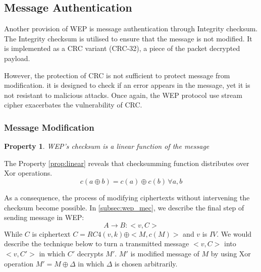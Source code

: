 \subsection{Message Authentication}
Another provision of \ac{WEP} is message authentication through Integrity checksum. The Integrity checksum is utilised to ensure that the message is not modified. It is implemented as a \ac{CRC} variant (\ac{CRC}-32), a piece of the packet decrypted payload.

However, the protection of \ac{CRC} is not sufficient to protect message from modification. it is designed to check if an error appears in the message, yet it is not resistant to malicious attacks. Once again, the \ac{WEP} protocol use stream cipher exacerbates the vulnerability of \ac{CRC}.

\subsubsection{Message Modification}
\newtheorem{property}{Property}

\begin{property}
	\ac{WEP}'s checksum is a linear function of the message
	\label{prop:linear}
\end{property}

The Property \autoref{prop:linear} reveals that checksumming function distributes over \ac{Xor} operations.
\begin{equation}
	c(a\oplus b) = c(a) \oplus c(b)\, \forall a,b
	\label{equation:linear_prop}
\end{equation}

As a consequence, the process of modifying ciphertexts without intervening the checksum become possible. In \autoref{subsec:wep_mec}, we describe the final step of sending message in \ac{WEP}:
\begin{equation}
	A \rightarrow B : <v,C>
\end{equation}
While $C$ is ciphertext $C = RC4(v,k) \oplus <M, c(M)>$ and $v$ is $IV$. We would describe the technique below to turn a transmitted message $<v, C>$ into $<v, C'>$ in which $C'$ decrypts $M'$. $M'$ is modified message of $M$ by using \ac{Xor} operation $M' = M\oplus \Delta$ in which $\Delta$ is chosen arbitrarily.
